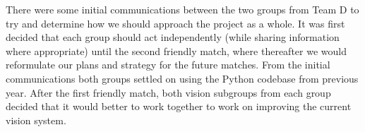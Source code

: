 There were some initial communications between the two groups from Team D to try and determine how we should approach the project as a whole. It was first decided that each group should act independently (while sharing information where appropriate) until the second friendly match, where thereafter we would reformulate our plans and strategy for the future matches. From the initial communications both groups settled on using the Python codebase from previous year. After the first friendly match, both vision subgroups from each group decided that it would better to work together to work on improving the current vision system. 